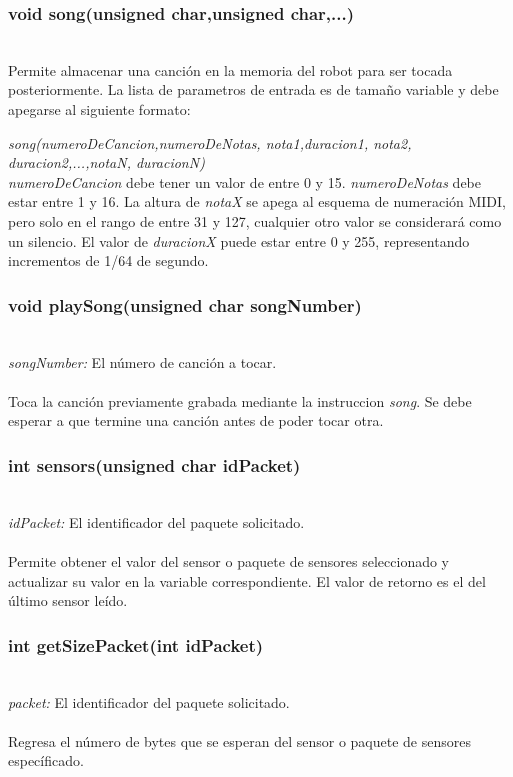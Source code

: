 \documentclass[letterpaper]{book}
\begin{document}
\subsubsection{	void song(unsigned char,unsigned char,...)}\mbox{}\\
Permite almacenar una canción en la memoria del robot para ser tocada posteriormente. La lista de parametros de entrada es de tamaño variable y debe apegarse al siguiente formato:

\emph{song(numeroDeCancion,numeroDeNotas, nota1,duracion1, nota2, duracion2,...,notaN, duracionN)}\\
\emph{numeroDeCancion} debe tener un valor de entre 0 y 15. \emph{numeroDeNotas} debe estar entre 1 y 16. La altura de \emph{notaX} se apega al esquema de numeración MIDI, pero solo en el rango de entre 31 y 127, cualquier otro valor se considerará como un silencio. El valor de \emph{duracionX} puede estar entre 0 y 255, representando incrementos de 1/64 de segundo.\\

\subsubsection{void playSong(unsigned char songNumber)}\mbox{}\\
\emph{songNumber: } El número de canción a tocar.\\\\
Toca la canción previamente grabada mediante la instruccion \emph{song}. Se debe esperar a que termine una canción antes de poder tocar otra.\\

\subsubsection{int sensors(unsigned char idPacket)}\mbox{}\\
\emph{idPacket: } El identificador del paquete solicitado.\\\\
Permite obtener el valor del sensor o paquete de sensores seleccionado y actualizar su valor en la variable correspondiente. El valor de retorno es el del último sensor leído.\\

\subsubsection{int getSizePacket(int idPacket)}\mbox{}\\
\emph{packet: } El identificador del paquete solicitado.\\\\
Regresa el número de bytes que se esperan del sensor o paquete de sensores específicado.\\
\end{document}
